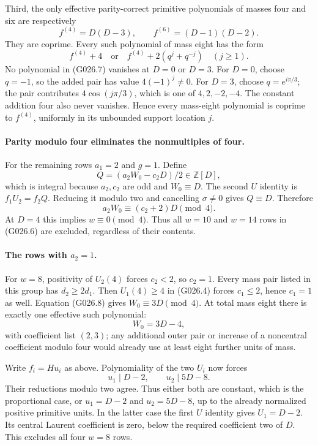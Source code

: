 Third, the only effective parity-correct primitive
polynomials of masses four and six are respectively
\[
 f^{(4)}=D(D-3),\qquad f^{(6)}=(D-1)(D-2).
\]
They are coprime. Every such polynomial of mass eight
has the form
\[
 f^{(4)}+4\quad\text{or}\quad
 f^{(4)}+2(q^j+q^{-j})\quad(j\ge1).                   \tag{G026.7}
\]
No polynomial in (G026.7) vanishes at $D=0$ or $D=3$.
For $D=0$, choose $q=-1$, so the added pair has value
$4(-1)^j\ne0$. For $D=3$, choose $q=e^{i\pi/3}$;
the pair contributes $4\cos(j\pi/3)$, which is one
of $4,2,-2,-4$. The constant addition four also
never vanishes. Hence every mass-eight polynomial
is coprime to $f^{(4)}$, uniformly in its unbounded
support location $j$.

\paragraph{Parity modulo four eliminates the nonmultiples of four.}
For the remaining rows $a_1=2$ and $g=1$. Define
\[
 Q=(a_2W_0-c_2D)/2\in\mathbb Z[D],
\]
which is integral because $a_2,c_2$ are odd and
$W_0\equiv D$. The second $U$ identity is
$f_1U_2=f_2Q$. Reducing it modulo two and cancelling
$\sigma\ne0$ gives $Q\equiv D$. Therefore
\[
 a_2W_0\equiv(c_2+2)D\pmod4.                        \tag{G026.8}
\]
At $D=4$ this implies $w\equiv0\pmod4$.
Thus all $w=10$ and $w=14$ rows in (G026.6) are
excluded, regardless of their contents.

\paragraph{The rows with $a_2=1$.}
For $w=8$, positivity of $U_2(4)$ forces $c_2<2$,
so $c_2=1$. Every mass pair listed in this group has
$d_2\ge2d_1$. Then $U_1(4)\ge4$ in (G026.4) forces
$c_1\le2$, hence $c_1=1$ as well.
Equation (G026.8) gives $W_0\equiv3D\pmod4$.
At total mass eight there is exactly one effective
such polynomial:
\[
 W_0=3D-4,
\]
with coefficient list $(2,3)$; any additional outer
pair or increase of a noncentral coefficient modulo
four would already use at least eight further units
of mass.

Write $f_i=Hu_i$ as above. Polynomiality of the two
$U_i$ now forces
\[
 u_1\mid D-2,\qquad u_2\mid5D-8.
\]
Their reductions modulo two agree. Thus either both
are constant, which is the proportional case, or
$u_1=D-2$ and $u_2=5D-8$, up to the already normalized
positive primitive units. In the latter case the
first $U$ identity gives $U_1=D-2$. Its central
Laurent coefficient is zero, below the required
coefficient two of $D$. This excludes all four
$w=8$ rows.

